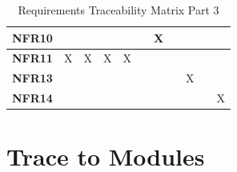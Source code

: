 \documentclass[12pt, titlepage]{article}
\begin{document}
\begin{table}[H]
\begin{tabular}{|c|c|c|c|c|c|c|c|c|c|c|}
    \textbf{NFR10} &                       &                       &                       &                     &                     & X                   &                     &                     &                     &                         \\ \hline
    \textbf{NFR11} & X                     & X                     & X                    & X                   &                     &                     &                     &                     &                     &                         \\ \hline
    \textbf{NFR13} &                       &                       &                       &                     &                     &                     &                     & X                   &                     &                         \\ \hline
    \textbf{NFR14} &                       &                       &                       &                     &                     &                     &                     &                     &                     & X                       \\ \hline
  \end{tabular}
  \caption{Requirements Traceability Matrix Part 3}
  \label{Table:C_Req_trace}
\end{table}
\newpage

\section{Trace to Modules}
\end{document}
